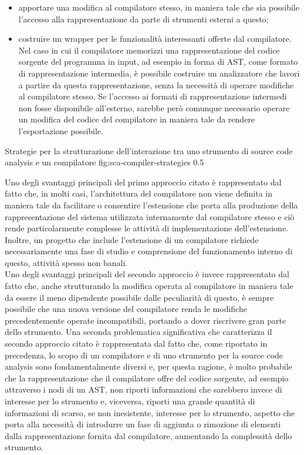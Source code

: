 \begin{itemize}

\item apportare una modifica al compilatore stesso, in maniera tale che sia
possibile l'accesso alla rappresentazione da parte di strumenti esterni a
questo;

\item costruire un wrapper per le funzionalità interessanti offerte dal
compilatore. Nel caso in cui il compilatore memorizzi una rappresentazione del
codice sorgente del programma in input, ad esempio in forma di AST, come formato
di rappresentazione intermedia, è possibile costruire un analizzatore che lavori
a partire da questa rappresentazione, senza la necessità di operare modifiche al
compilatore stesso. Se l’accesso ai formati di rappresentazione intermedi non
fosse disponibile all’esterno, sarebbe però comunque necessario operare un
modifica del codice del compilatore in maniera tale da rendere l’esportazione
possibile.

\end{itemize}

      {Strategie per la strutturazione dell'interazione tra uno strumento di
      source code analysis e un compilatore}
      {fig:sca-compiler-strategies}
      {0.5}

Uno degli svantaggi principali del primo approccio citato è rappresentato dal
fatto che, in molti casi, l'architettura del compilatore non viene definita in
maniera tale da facilitare o consentire l'estensione che porta alla produzione
della rappresentazione del sistema utilizzata internamente dal compilatore
stesso e ciò rende particolarmente complesse le attività di implementazione
dell'estensione. Inoltre, un progetto che include l'estensione di un compilatore
richiede necessariamente una fase di studio e comprensione del funzionamento
interno di questo, attività spesso non banali.\\

Uno degli svantaggi principali del secondo approccio è invece rappresentato dal
fatto che, anche strutturando la modifica operata al compilatore in maniera tale
da essere il meno dipendente possibile dalle peculiarità di questo, è sempre
possibile che una nuova versione del compilatore renda le modifiche
precedentemente operate incompatibili, portando a dover riscrivere gran parte
dello strumento. Una seconda problematica significativa che caratterizza il
secondo approccio citato è rappresentata dal fatto che, come riportato in
precedenza, lo scopo di un compilatore e di uno strumento per la source code
analysis sono fondamentalmente diversi e, per questa ragione, è molto probabile
che la rappresentazione che il compilatore offre del codice sorgente, ad esempio
attraverso i nodi di un AST, non riporti informazioni che sarebbero invece di
interesse per lo strumento e, viceversa, riporti una grande quantità di
informazioni di scarso, se non inesistente, interesse per lo strumento, aspetto
che porta alla necessità di introdurre un fase di aggiunta o rimozione di
elementi dalla rappresentazione fornita dal compilatore, aumentando la
complessità dello strumento.\\

